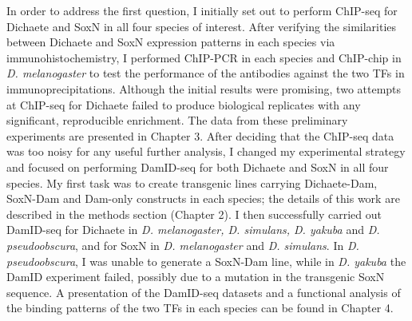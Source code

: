 In order to address the first question, I initially set out to perform ChIP-seq for Dichaete and SoxN in all four species of interest. After verifying the similarities between Dichaete and SoxN expression patterns in each species via immunohistochemistry, I performed ChIP-PCR in each species and ChIP-chip in \emph{D. melanogaster} to test the performance of the antibodies against the two TFs in immunoprecipitations. Although the initial results were promising, two attempts at ChIP-seq for Dichaete failed to produce biological replicates with any significant, reproducible enrichment. The data from these preliminary experiments are presented in Chapter 3. After deciding that the ChIP-seq data was too noisy for any useful further analysis, I changed my experimental strategy and focused on performing DamID-seq for both Dichaete and SoxN in all four species. My first task was to create transgenic lines carrying Dichaete-Dam, SoxN-Dam and Dam-only constructs in each species; the details of this work are described in the methods section (Chapter 2). I then successfully carried out DamID-seq for Dichaete in \emph{D. melanogaster, D. simulans, D. yakuba} and \emph{D. pseudoobscura}, and for SoxN in \emph{D. melanogaster} and \emph{D. simulans}. In \emph{D. pseudoobscura}, I was unable to generate a SoxN-Dam line, while in \emph{D. yakuba} the DamID experiment failed, possibly due to a mutation in the transgenic SoxN sequence. A presentation of the DamID-seq datasets and a functional analysis of the binding patterns of the two TFs in each species can be found in Chapter 4.\\

